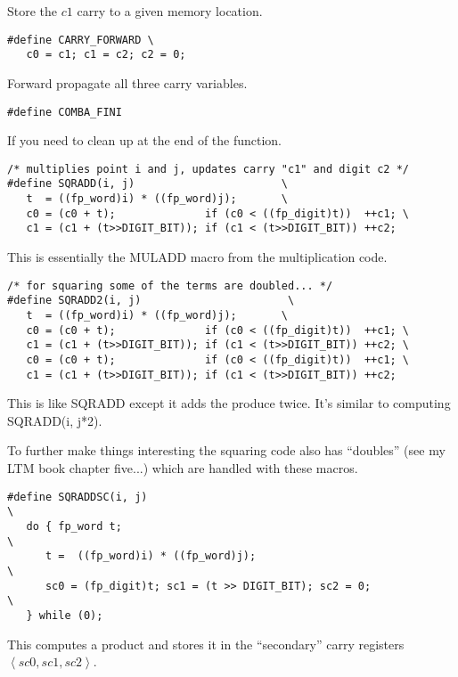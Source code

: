 \documentclass[b5paper]{book}
\begin{document}
Store the $c1$ carry to a given memory location.

\begin{verbatim}
#define CARRY_FORWARD \
   c0 = c1; c1 = c2; c2 = 0;
\end{verbatim}

Forward propagate all three carry variables.

\begin{verbatim}
#define COMBA_FINI
\end{verbatim}

If you need to clean up at the end of the function.

\begin{verbatim}
/* multiplies point i and j, updates carry "c1" and digit c2 */
#define SQRADD(i, j)                       \
   t  = ((fp_word)i) * ((fp_word)j);       \
   c0 = (c0 + t);              if (c0 < ((fp_digit)t))  ++c1; \
   c1 = (c1 + (t>>DIGIT_BIT)); if (c1 < (t>>DIGIT_BIT)) ++c2; 
\end{verbatim}

This is essentially the MULADD macro from the multiplication code.

\begin{verbatim}
/* for squaring some of the terms are doubled... */
#define SQRADD2(i, j)                       \
   t  = ((fp_word)i) * ((fp_word)j);       \
   c0 = (c0 + t);              if (c0 < ((fp_digit)t))  ++c1; \
   c1 = (c1 + (t>>DIGIT_BIT)); if (c1 < (t>>DIGIT_BIT)) ++c2; \
   c0 = (c0 + t);              if (c0 < ((fp_digit)t))  ++c1; \
   c1 = (c1 + (t>>DIGIT_BIT)); if (c1 < (t>>DIGIT_BIT)) ++c2; 
\end{verbatim}

This is like SQRADD except it adds the produce twice.  It's similar to 
computing SQRADD(i, j*2).

To further make things interesting the squaring code also has ``doubles'' (see my LTM book chapter five...) which are
handled with these macros.

\begin{verbatim}
#define SQRADDSC(i, j)                                                         \
   do { fp_word t;                                                             \
      t =  ((fp_word)i) * ((fp_word)j);                                        \
      sc0 = (fp_digit)t; sc1 = (t >> DIGIT_BIT); sc2 = 0;                      \
   } while (0);
\end{verbatim}
This computes a product and stores it in the ``secondary'' carry registers $\left < sc0, sc1, sc2 \right >$.
\end{document}
